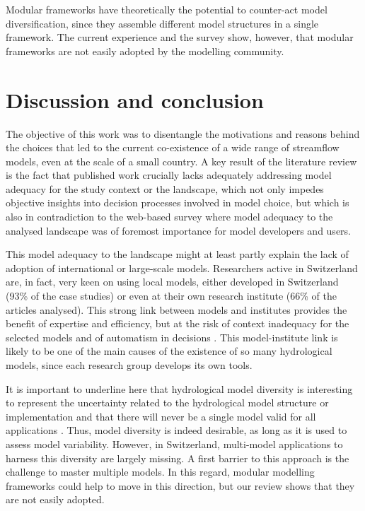 \documentclass[10pt,a4paper]{article}
\begin{document}
Modular frameworks have theoretically the potential to counter-act model diversification, since they assemble different model structures in a single framework. The current experience and the survey show, however, that modular frameworks are not easily adopted by the modelling community. 


\section{Discussion and conclusion}
\label{sec:conclusion}

The objective of this work was to disentangle the motivations and reasons behind the choices that led to the current co-existence of a wide range of streamflow models, even at the scale of a small country. A key result of the literature review is the fact that published work crucially lacks adequately addressing model adequacy for the study context or the landscape, which not only impedes objective insights into decision processes involved in model choice, but which is also in contradiction to the  web-based survey where model adequacy to the analysed landscape was of foremost importance for model developers and users. 

This model adequacy to the landscape might at least partly explain the lack of adoption of international or large-scale models. Researchers active in Switzerland are, in fact, very keen on using local models, either developed in Switzerland (93\% of the case studies) or even at their own research institute (66\% of the articles analysed). This strong link between models and institutes provides the benefit of expertise and efficiency, but at the risk of context inadequacy for the selected models and of automatism in decisions \citep{Babel2019}. This model-institute link is likely to be one of the main causes of the existence of so many hydrological models, since each research group develops its own tools.

It is important to underline here that hydrological model diversity is interesting to represent the uncertainty related to the hydrological model structure or implementation \citep{Babel2019} and that there will never be a single model valid for all applications \citep{Hamalainen2015}. Thus, model diversity is indeed desirable, as long as it is used to assess model variability. However, in Switzerland, multi-model applications to harness this diversity are largely missing. A first barrier to this approach is the challenge to master multiple models. In this regard, modular modelling frameworks could help to move in this direction, but our review shows that they are not easily adopted.
\end{document}
